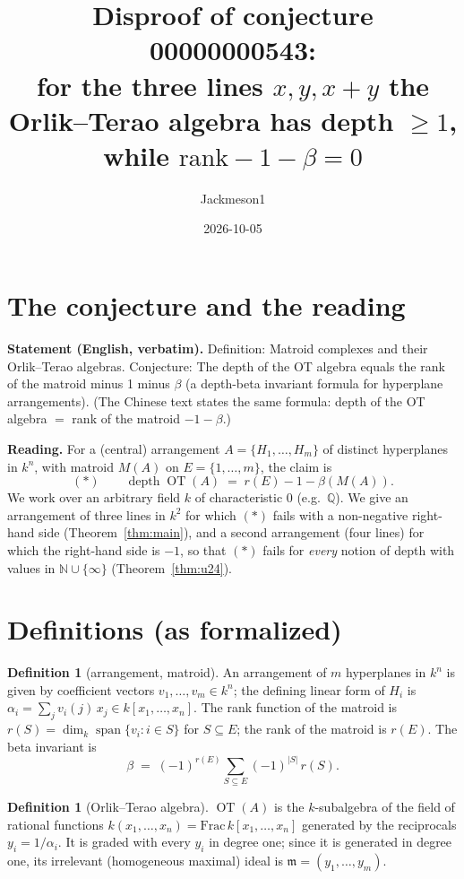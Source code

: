 \documentclass[11pt]{article}
\title{Disproof of conjecture 00000000543:\\ for the three lines $x,y,x+y$ the Orlik--Terao algebra has
depth $\geq 1$, while $\mathrm{rank}-1-\beta=0$}
\author{Jackmeson1}
\date{2026-10-05}
\theoremstyle{definition}
\newtheorem{definition}[theorem]{Definition}
\theoremstyle{remark}
\newcommand{\OT}{\operatorname{OT}}
\newcommand{\rk}{r}
\newcommand{\depth}{\operatorname{depth}}
\begin{document}
\maketitle

\section{The conjecture and the reading}

\textbf{Statement (English, verbatim).} Definition: Matroid complexes and their Orlik--Terao
algebras. Conjecture: The depth of the OT algebra equals the rank of the matroid minus 1 minus
$\beta$ (a depth-beta invariant formula for hyperplane arrangements). (The Chinese text states the
same formula: depth of the OT algebra $=$ rank of the matroid $-1-\beta$.)

\textbf{Reading.} For a (central) arrangement $A=\{H_1,\dots,H_m\}$ of distinct hyperplanes in
$k^n$, with matroid $M(A)$ on $E=\{1,\dots,m\}$, the claim is
\[
  (\ast)\qquad \depth \OT(A) \;=\; \rk(E) - 1 - \beta(M(A)).
\]
We work over an arbitrary field $k$ of characteristic $0$ (e.g.\ $\mathbb{Q}$). We give an
arrangement of three lines in $k^2$ for which $(\ast)$ fails with a non-negative right-hand side
(Theorem~\ref{thm:main}), and a second arrangement (four lines) for which the right-hand side is
$-1$, so that $(\ast)$ fails for \emph{every} notion of depth with values in
$\mathbb{N}\cup\{\infty\}$ (Theorem~\ref{thm:u24}).

\section{Definitions (as formalized)}

\begin{definition}[arrangement, matroid]
An arrangement of $m$ hyperplanes in $k^n$ is given by coefficient vectors
$v_1,\dots,v_m\in k^n$; the defining linear form of $H_i$ is
$\alpha_i=\sum_j v_i(j)\,x_j\in k[x_1,\dots,x_n]$. The rank function of the matroid is
$\rk(S)=\dim_k \operatorname{span}\{v_i : i\in S\}$ for $S\subseteq E$; the rank of the matroid is
$\rk(E)$. The beta invariant is
\[
  \beta \;=\; (-1)^{\rk(E)}\sum_{S\subseteq E}(-1)^{|S|}\,\rk(S).
\]
\end{definition}

\begin{definition}[Orlik--Terao algebra]
$\OT(A)$ is the $k$-subalgebra of the field of rational functions
$k(x_1,\dots,x_n)=\mathrm{Frac}\,k[x_1,\dots,x_n]$ generated by the reciprocals
$y_i=1/\alpha_i$. It is graded with every $y_i$ in degree one; since it is generated in degree one,
its irrelevant (homogeneous maximal) ideal is $\mathfrak{m}=(y_1,\dots,y_m)$.
\end{definition}
\end{document}
